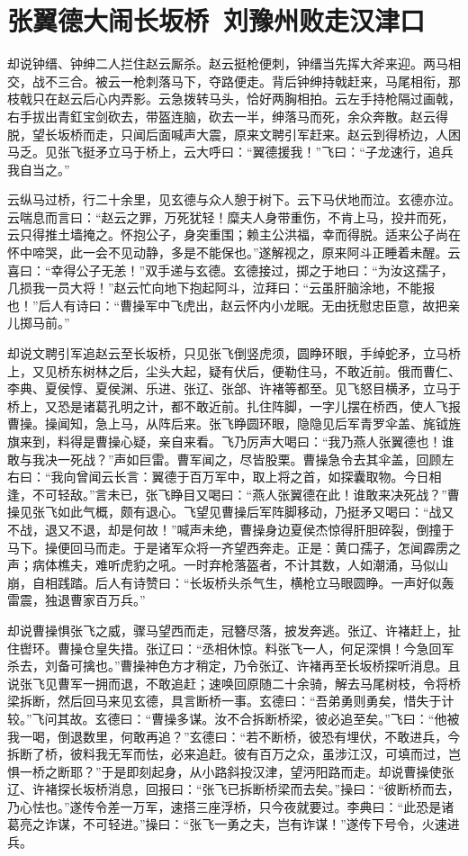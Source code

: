 \chapter{张翼德大闹长坂桥~刘豫州败走汉津口}

却说钟缙、钟绅二人拦住赵云厮杀。赵云挺枪便刺，钟缙当先挥大斧来迎。两马相交，战不三合。被云一枪刺落马下，夺路便走。背后钟绅持戟赶来，马尾相衔，那枝戟只在赵云后心内弄影。云急拨转马头，恰好两胸相拍。云左手持枪隔过画戟，右手拔出青釭宝剑砍去，带盔连脑，砍去一半，绅落马而死，余众奔散。赵云得脱，望长坂桥而走，只闻后面喊声大震，原来文聘引军赶来。赵云到得桥边，人困马乏。见张飞挺矛立马于桥上，云大呼曰：“翼德援我！”飞曰：“子龙速行，追兵我自当之。”

云纵马过桥，行二十余里，见玄德与众人憩于树下。云下马伏地而泣。玄德亦泣。云喘息而言曰：“赵云之罪，万死犹轻！糜夫人身带重伤，不肯上马，投井而死，云只得推土墙掩之。怀抱公子，身突重围；赖主公洪福，幸而得脱。适来公子尚在怀中啼哭，此一会不见动静，多是不能保也。”遂解视之，原来阿斗正睡着未醒。云喜曰：“幸得公子无恙！”双手递与玄德。玄德接过，掷之于地曰：“为汝这孺子，几损我一员大将！”赵云忙向地下抱起阿斗，泣拜曰：“云虽肝脑涂地，不能报也！”后人有诗曰：“曹操军中飞虎出，赵云怀内小龙眠。无由抚慰忠臣意，故把亲儿掷马前。”

却说文聘引军追赵云至长坂桥，只见张飞倒竖虎须，圆睁环眼，手绰蛇矛，立马桥上，又见桥东树林之后，尘头大起，疑有伏后，便勒住马，不敢近前。俄而曹仁、李典、夏侯惇、夏侯渊、乐进、张辽、张郃、许褚等都至。见飞怒目横矛，立马于桥上，又恐是诸葛孔明之计，都不敢近前。扎住阵脚，一字儿摆在桥西，使人飞报曹操。操闻知，急上马，从阵后来。张飞睁圆环眼，隐隐见后军青罗伞盖、旄钺旌旗来到，料得是曹操心疑，亲自来看。飞乃厉声大喝曰：“我乃燕人张翼德也！谁敢与我决一死战？”声如巨雷。曹军闻之，尽皆股栗。曹操急令去其伞盖，回顾左右曰：“我向曾闻云长言：翼德于百万军中，取上将之首，如探囊取物。今日相逢，不可轻敌。”言未已，张飞睁目又喝曰：“燕人张翼德在此！谁敢来决死战？”曹操见张飞如此气概，颇有退心。飞望见曹操后军阵脚移动，乃挺矛又喝曰：“战又不战，退又不退，却是何故！”喊声未绝，曹操身边夏侯杰惊得肝胆碎裂，倒撞于马下。操便回马而走。于是诸军众将一齐望西奔走。正是：黄口孺子，怎闻霹雳之声；病体樵夫，难听虎豹之吼。一时弃枪落盔者，不计其数，人如潮涌，马似山崩，自相践踏。后人有诗赞曰：“长坂桥头杀气生，横枪立马眼圆睁。一声好似轰雷震，独退曹家百万兵。”

却说曹操惧张飞之威，骤马望西而走，冠簪尽落，披发奔逃。张辽、许褚赶上，扯住辔环。曹操仓皇失措。张辽曰：“丞相休惊。料张飞一人，何足深惧！今急回军杀去，刘备可擒也。”曹操神色方才稍定，乃令张辽、许褚再至长坂桥探听消息。且说张飞见曹军一拥而退，不敢追赶；速唤回原随二十余骑，解去马尾树枝，令将桥梁拆断，然后回马来见玄德，具言断桥一事。玄德曰：“吾弟勇则勇矣，惜失于计较。”飞问其故。玄德曰：“曹操多谋。汝不合拆断桥梁，彼必追至矣。”飞曰：“他被我一喝，倒退数里，何敢再追？”玄德曰：“若不断桥，彼恐有埋伏，不敢进兵，今拆断了桥，彼料我无军而怯，必来追赶。彼有百万之众，虽涉江汉，可填而过，岂惧一桥之断耶？”于是即刻起身，从小路斜投汉津，望沔阳路而走。却说曹操使张辽、许褚探长坂桥消息，回报曰：“张飞已拆断桥梁而去矣。”操曰：“彼断桥而去，乃心怯也。”遂传令差一万军，速搭三座浮桥，只今夜就要过。李典曰：“此恐是诸葛亮之诈谋，不可轻进。”操曰：“张飞一勇之夫，岂有诈谋！”遂传下号令，火速进兵。

